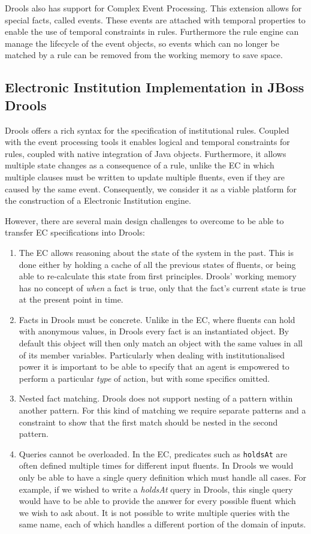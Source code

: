 Drools also has support for Complex Event Processing. This extension allows for
special facts, called events. These events are attached with temporal properties
to enable the use of temporal constraints in rules. Furthermore the rule engine
can manage the lifecycle of the event objects, so events which can no longer be
matched by a rule can be removed from the working memory to save space.

\subsection{Electronic Institution Implementation in JBoss Drools}

Drools offers a rich syntax for the specification of institutional rules.
Coupled with the event processing tools it enables logical and temporal
constraints for rules, coupled with native integration of Java objects.
Furthermore, it allows multiple state changes as a consequence of a rule, unlike
the \ac{EC} in which multiple clauses must be written to update multiple
fluents, even if they are caused by the same event. Consequently, we consider it as
a viable platform for the construction of a Electronic Institution engine.

However, there are several main design challenges to overcome to be able to transfer
\ac{EC} specifications into Drools:
\begin{enumerate}
\item The \ac{EC} allows reasoning about the state of the system in the past. This is
done either by holding a cache of all the previous states of fluents, or being
able to re-calculate this state from first principles. Drools' working memory
has no concept of \emph{when} a fact is true, only that the fact's current
state is true at the present point in time.
\item Facts in Drools must be concrete. Unlike in the \ac{EC}, where fluents can
hold with anonymous values, in Drools every fact is an
instantiated object. By default this object will then only match an object with
the same values in all of its member variables. Particularly when dealing with
institutionalised power it is important to be able to specify that an agent is
empowered to perform a particular \emph{type} of action, but with some specifics
omitted.
\item Nested fact matching. Drools does not support nesting of a pattern within
another pattern. For this kind of matching we require separate patterns and a
constraint to show that the first match should be nested in the second pattern.
\item Queries cannot be overloaded. In the \ac{EC}, predicates such as \texttt{holdsAt}
are often defined multiple times for different input fluents. In Drools we would
only be able to have a single query definition which must handle all cases. For example, if we wished to write a \emph{holdsAt} query in Drools, this single query would have to be able to provide the answer for every possible fluent which we wish to ask about. It is not possible to write multiple queries with the same name, each of which handles a different portion of the domain of inputs.
\end{enumerate}

